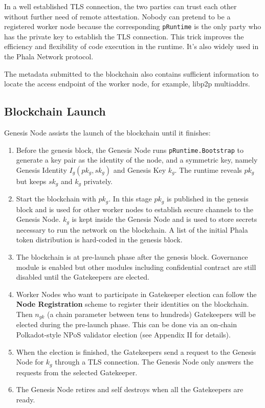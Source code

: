 In a well established TLS connection, the two parties can trust each other without further need of remote attestation. Nobody can pretend to be a registered worker node because the corresponding \texttt{pRuntime} is the only party who has the private key to establish the TLS connection. This trick improves the efficiency and flexibility of code execution in the runtime. It's also widely used in the Phala Network protocol.

The metadata submitted to the blockchain also contains sufficient information to locate the access endpoint of the worker node, for example, libp2p multiaddrs.

\subsection{Blockchain Launch}

Genesis Node assists the launch of the blockchain until it finishes:

\begin{enumerate}
    \item Before the genesis block, the Genesis Node runs \texttt{pRuntime.Bootstrap} to generate a key pair as the identity of the node, and a symmetric key, namely Genesis Identity $I_g(pk_g, sk_g)$ and Genesis Key $k_g$. The runtime reveals $pk_g$ but keeps $sk_g$ and $k_g$ privately.

    \item Start the blockchain with $pk_g$. In this stage $pk_g$ is published in the genesis block and is used for other worker nodes to establish secure channels to the Genesis Node. $k_g$ is kept inside the Genesis Node and is used to store secrets necessary to run the network on the blockchain. A list of the initial Phala token distribution is hard-coded in the genesis block.

    \item The blockchain is at pre-launch phase after the genesis block. Governance module is enabled but other modules including confidential contract are still disabled until the Gatekeepers are elected.

    \item Worker Nodes who want to participate in Gatekeeper election can follow the \textbf{Node Registration} scheme to register their identities on the blockchain. Then $n_{gk}$ (a chain parameter between tens to hundreds) Gatekeepers will be elected during the pre-launch phase. This can be done via an on-chain Polkadot-style NPoS validator election (see Appendix II for details).

    \item When the election is finished, the Gatekeepers send a request to the Genesis Node for $k_g$ through a TLS connection. The Genesis Node only answers the requests from the selected Gatekeeper.

    \item The Genesis Node retires and self destroys when all the Gatekeepers are ready.
\end{enumerate}

